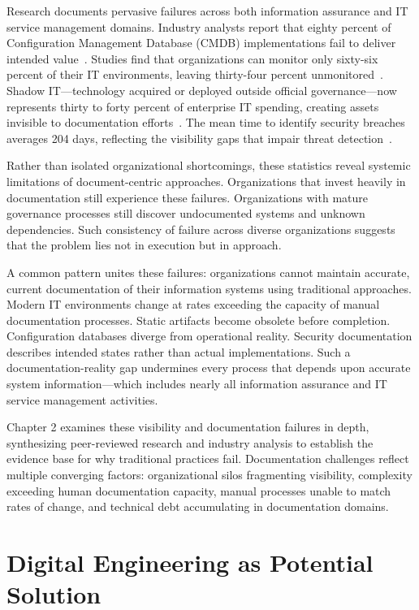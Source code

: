 Research documents pervasive failures across both information assurance and IT service management domains. Industry analysts report that eighty percent of Configuration Management Database (CMDB) implementations fail to deliver intended value~\parencite{Gartner_CMDB_2019}. Studies find that organizations can monitor only sixty-six percent of their IT environments, leaving thirty-four percent unmonitored~\parencite{IDC_Exabeam_2023}. Shadow IT---technology acquired or deployed outside official governance---now represents thirty to forty percent of enterprise IT spending, creating assets invisible to documentation efforts~\parencite{Gartner_Shadow_IT_2022}. The mean time to identify security breaches averages 204 days, reflecting the visibility gaps that impair threat detection~\parencite{IBM_Ponemon_2024}.

Rather than isolated organizational shortcomings, these statistics reveal systemic limitations of document-centric approaches. Organizations that invest heavily in documentation still experience these failures. Organizations with mature governance processes still discover undocumented systems and unknown dependencies. Such consistency of failure across diverse organizations suggests that the problem lies not in execution but in approach.

A common pattern unites these failures: organizations cannot maintain accurate, current documentation of their information systems using traditional approaches. Modern IT environments change at rates exceeding the capacity of manual documentation processes. Static artifacts become obsolete before completion. Configuration databases diverge from operational reality. Security documentation describes intended states rather than actual implementations. Such a documentation-reality gap undermines every process that depends upon accurate system information---which includes nearly all information assurance and IT service management activities.

Chapter 2 examines these visibility and documentation failures in depth, synthesizing peer-reviewed research and industry analysis to establish the evidence base for why traditional practices fail. Documentation challenges reflect multiple converging factors: organizational silos fragmenting visibility, complexity exceeding human documentation capacity, manual processes unable to match rates of change, and technical debt accumulating in documentation domains.

\section{Digital Engineering as Potential Solution}

